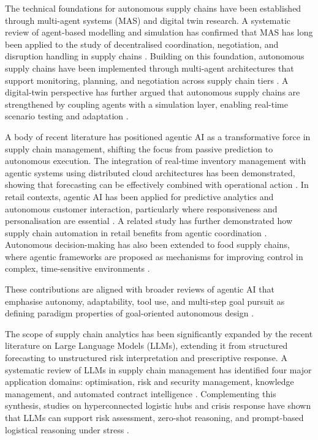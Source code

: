 The technical foundations for autonomous supply chains have been established through multi-agent systems (\gls{MAS}) and digital twin research. A systematic review of agent-based modelling and simulation has confirmed that \gls{MAS} has long been applied to the study of decentralised coordination, negotiation, and disruption handling in supply chains \cite{WangZhangLiu2020}. Building on this foundation, autonomous supply chains have been implemented through multi-agent architectures that support monitoring, planning, and negotiation across supply chain tiers \cite{XuEtAl2024}. A digital-twin perspective has further argued that autonomous supply chains are strengthened by coupling agents with a simulation layer, enabling real-time scenario testing and adaptation \cite{XuLuEtAl2024}.

A body of recent literature has positioned agentic AI as a transformative force in supply chain management, shifting the focus from passive prediction to autonomous execution. The integration of real-time inventory management with agentic systems using distributed cloud architectures has been demonstrated, showing that forecasting can be effectively combined with operational action \cite{Tiwari2025}. In retail contexts, agentic AI has been applied for predictive analytics and autonomous customer interaction, particularly where responsiveness and personalisation are essential \cite{Kalisetty2024}. A related study has further demonstrated how supply chain automation in retail benefits from agentic coordination \cite{KalisettySingireddy2023}. Autonomous decision-making has also been extended to food supply chains, where agentic frameworks are proposed as mechanisms for improving control in complex, time-sensitive environments \cite{Pamisetty2024}.

These contributions are aligned with broader reviews of agentic AI that emphasise autonomy, adaptability, tool use, and multi-step goal pursuit as defining paradigm properties of goal-oriented autonomous design \cite{HosseiniSeilani2025}.

The scope of supply chain analytics has been significantly expanded by the recent literature on Large Language Models (\gls{LLM}s), extending it from structured forecasting to unstructured risk interpretation and prescriptive response. A systematic review of LLMs in supply chain management has identified four major application domains: optimisation, risk and security management, knowledge management, and automated contract intelligence \cite{QuHuIvanov2026}. Complementing this synthesis, studies on hyperconnected logistic hubs and crisis response have shown that LLMs can support risk assessment, zero-shot reasoning, and prompt-based logistical reasoning under stress \cite{ZhaoSunLiu2025}.

